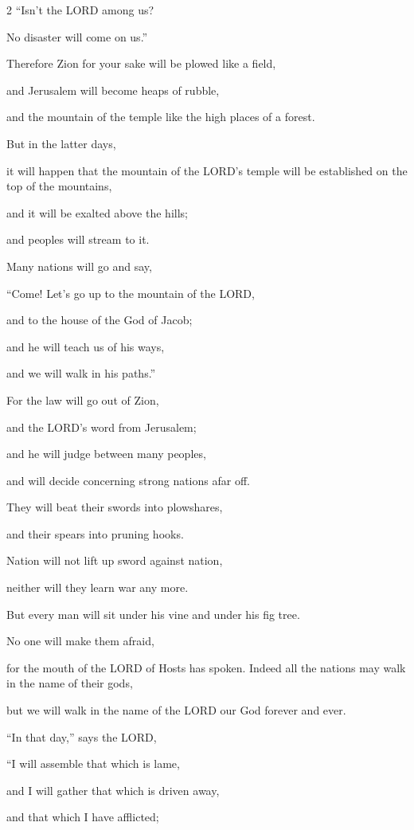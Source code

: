 \begin{multicols}{2}
“Isn’t the LORD among us?

No disaster will come on us.”

\myverse{}Therefore Zion for your sake will be plowed like a field,

and Jerusalem will become heaps of rubble,

and the mountain of the temple like the high places of a forest.


\mychapter{} \myverse*{}But in the latter days,

it will happen that the mountain of the LORD’s temple will be established on the
top of the mountains,

and it will be exalted above the hills;

and peoples will stream to it.

\myverse{}Many nations will go and say,

“Come! Let’s go up to the mountain of the LORD,

and to the house of the God of Jacob;

and he will teach us of his ways,

and we will walk in his paths.”

For the law will go out of Zion,

and the LORD’s word from Jerusalem;

\myverse{}and he will judge between many peoples,

and will decide concerning strong nations afar off.

They will beat their swords into plowshares,

and their spears into pruning hooks.

Nation will not lift up sword against nation,

neither will they learn war any more.

\myverse{}But every man will sit under his vine and under his fig tree.

No one will make them afraid,

for the mouth of the LORD of Hosts has spoken.
\myverse{}Indeed all the nations may walk in the name of their gods,

but we will walk in the name of the LORD our God forever and ever.

\myverse{}“In that day,” says the LORD,

“I will assemble that which is lame,

and I will gather that which is driven away,

and that which I have afflicted;


\end{multicols}
